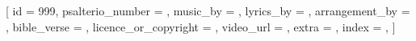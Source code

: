[
    id                     = {999},
    psalterio_number       = {},
    music_by               = {},
    lyrics_by              = {},
    arrangement_by         = {},
    bible_verse            = {},
    licence_or_copyright   = {},
    video_url              = {},
    extra                  = {},
    index                  = {},
]


\beginverse


\endverse


\beginchorus


\endchorus


\beginverse


\endverse



\endsong
